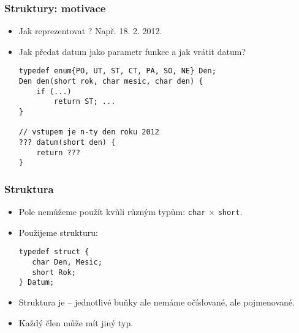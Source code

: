 \documentclass{beamer}
\newenvironment{itemizex}%
  {\large \begin{itemize}%
    \setlength{\itemsep}{8pt}%
    \setlength{\parskip}{8pt}}%
  {\end{itemize}}
\begin{document}
\begin{frame}[t,fragile]\frametitle{Struktury: motivace} 
    \begin{itemizex}
        \item Jak reprezentovat ? Např. 18. 2. 2012.
        \item Jak předat datum jako parametr funkce a jak vrátit datum?
\begin{verbatim} 
typedef enum{PO, UT, ST, CT, PA, SO, NE} Den;
Den den(short rok, char mesic, char den) {
    if (...) 
        return ST; ...
}

// vstupem je n-ty den roku 2012
??? datum(short den) {
    return ???
}
\end{verbatim}
    \end{itemizex}
\end{frame}


\begin{frame}[t,fragile]\frametitle{Struktura} 
    \begin{itemizex}
        \item Pole nemůžeme použít kvůli různým typům: \texttt{char} $\times$ \texttt{short}.
        \item Použijeme strukturu: 
        \begin{verbatim} 
typedef struct {
   char Den, Mesic; 
   short Rok;
} Datum;
        \end{verbatim}
        \item Struktura je  -- jednotlivé buňky ale nemáme očíslované, ale pojmenované.
        \item Každý člen může mít jiný typ.
    \end{itemizex}
\end{frame}
\end{document}
